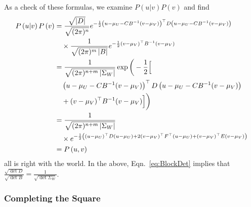 As a check of these formulas, we examine $P\left(u |v \right) P\left(v
\right)$ and find
\begin{align*}
  P\left(u |v \right) P\left(v \right) &= \frac{\sqrt{\left| D
      \right|}} {\sqrt{(2\pi)^n}} e^{ -\frac{1}{2} \left(u - \mu_U -
      CB^{-1}(v - \mu_V) \right)^\top D \left(u - \mu_U -
      CB^{-1}(v - \mu_V) \right)
  } \\
  &\quad \times \frac{1}{\sqrt{(2\pi)^m \left| B \right|}} e^{ -\frac{1}{2}
    (v-\mu_V)^\top B^{-1} (v-\mu_V)}\\
    &= \frac{1} {\sqrt{(2\pi)^{n+m} \left| \Sigma_W
      \right| }} \exp \bigg( -\frac{1}{2} \Big[ \\
  &\quad \left( u - \mu_U - CB^{-1}(v - \mu_V) \right)^\top D
       \left(u - \mu_U - CB^{-1}(v - \mu_V) \right)  \\
     &\quad + (v-\mu_V)^\top B^{-1} (v-\mu_V) \Big]\bigg)\\
     &= \frac{1} {\sqrt{(2\pi)^{n+m} \left| \Sigma_W \right| }}\\
     &\quad\times e^{ -\frac{1}{2} \left((u-\mu_U)^\top D (u-\mu_U) +
         2 (v-\mu_V)^\top F^\top (u-\mu_U) +
         (v-\mu_V)^\top E (v-\mu_V)\right)}\\
     &= P \left(u,v \right)
\end{align*}
all is right with the world.  In the above, Eqn.~\eqref{eq:BlockDet}
implies that $\frac{\sqrt{\det{D}}}{\sqrt{\det{B}}} =
\frac{1}{\sqrt{\det{\Sigma_W}}}$.


\subsubsection{Completing the Square}

